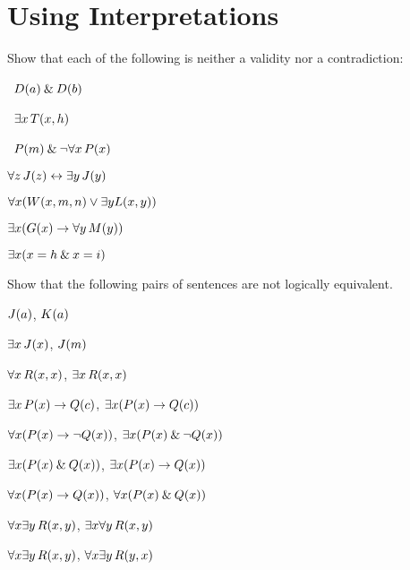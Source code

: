 \chapter{Using Interpretations}\setcounter{ProbPart}{0}

\solutions
\problempart
\label{pr.Contingent}
Show that each of the following is neither a validity nor a contradiction:
\begin{earg}
\item \leftsolutions\ $\mathord{D}(a) \mathbin{\&} \mathord{D}(b)$
\item \leftsolutions\ $\exists x\,\mathord{T}(x,h)$
\item \leftsolutions\ $\mathord{P}(m) \mathbin{\&} \neg\forall x\,\mathord{P}(x)$
\item $\forall z\, \mathord{J}(z) \leftrightarrow \exists y\,\mathord{J}(y)$
\item $\forall x (\mathord{W}(x,m,n) \vee \exists y\mathord{L}(x,y))$
\item $\exists x (\mathord{G}(x) \rightarrow \forall y\,\mathord{M}(y))$
\item $\exists x (x = h \mathbin{\&} x = i)$
\end{earg}

\solutions
\problempart
\label{pr.NotEquiv}
Show that the following pairs of sentences are not logically equivalent.
\begin{earg}
\item $\mathord{J}(a)$, $\mathord{K}(a)$
\item $\exists x\,\mathord{J}(x)$, $\mathord{J}(m)$
\item $\forall x\,\mathord{R}(x,x)$, $\exists x\,\mathord{R}(x,x)$
\item $\exists x\,\mathord{P}(x) \rightarrow \mathord{Q}(c)$, $\exists x (\mathord{P}(x) \rightarrow \mathord{Q}(c))$
\item $\forall x(\mathord{P}(x) \rightarrow \neg \mathord{Q}(x))$, $\exists x(\mathord{P}(x) \mathbin{\&} \neg \mathord{Q}(x))$
\item $\exists x(\mathord{P}(x) \mathbin{\&} \mathord{Q}(x))$, $\exists x(\mathord{P}(x) \rightarrow \mathord{Q}(x))$
\item $\forall x(\mathord{P}(x)\rightarrow \mathord{Q}(x))$, $\forall x(\mathord{P}(x) \mathbin{\&} \mathord{Q}(x))$
\item $\forall x\exists y\,\mathord{R}(x,y)$, $\exists x\forall y\,\mathord{R}(x,y)$
\item $\forall x\exists y\,\mathord{R}(x,y)$, $\forall x\exists y\,\mathord{R}(y,x)$
\end{earg}


